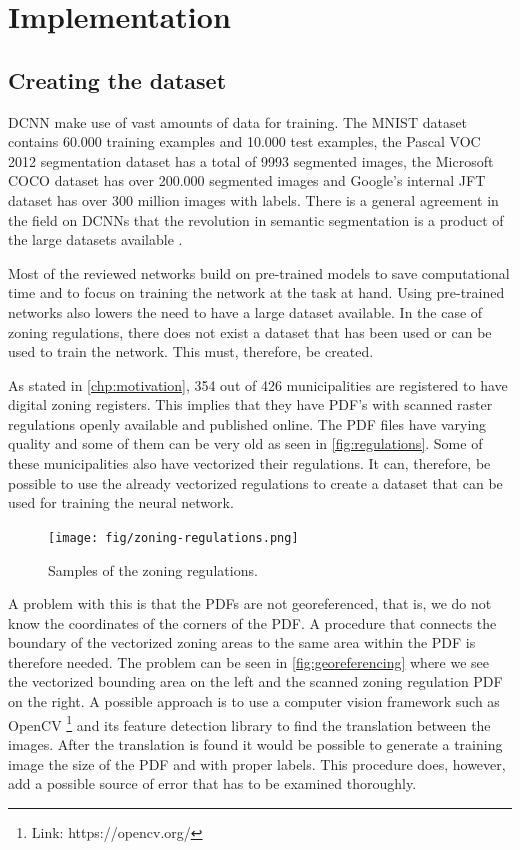 \chapter{Implementation}

\section{Creating the dataset}\label{chp:dataset}
DCNN make use of vast amounts of data for training. The MNIST dataset contains 60.000 training examples and 10.000 test examples, the Pascal VOC 2012 segmentation dataset \cite{PASCALVOC2012} has a total of 9993 segmented images, the Microsoft COCO dataset \cite{Lin2014} has over 200.000 segmented images and Google's internal JFT dataset \cite{Hinton2015} has over 300 million images with labels. There is a general agreement in the field on DCNNs that the revolution in semantic segmentation is a product of the large datasets available \cite{Sun2017}.

Most of the reviewed networks build on pre-trained models to save computational time and to focus on training the network at the task at hand. Using pre-trained networks also lowers the need to have a large dataset available. In the case of zoning regulations, there does not exist a dataset that has been used or can be used to train the network. This must, therefore, be created.

As stated in \autoref{chp:motivation}, 354 out of 426 municipalities are registered to have digital zoning registers. This implies that they have PDF's with scanned raster regulations openly available and published online. The PDF files have varying quality and some of them can be very old as seen in \autoref{fig:regulations}. Some of these municipalities also have vectorized their regulations. It can, therefore, be possible to use the already vectorized regulations to create a dataset that can be used for training the neural network.

\begin{figure}[H]
    \centering
    \texttt{[image: fig/zoning-regulations.png]}
    \caption{Samples of the zoning regulations.}
    \label{fig:regulations}
\end{figure}

A problem with this is that the PDFs are not georeferenced, that is, we do not know the coordinates of the corners of the PDF. A procedure that connects the boundary of the vectorized zoning areas to the same area within the PDF is therefore needed. The problem can be seen in \autoref{fig:georeferencing} where we see the vectorized bounding area on the left and the scanned zoning regulation PDF on the right. A possible approach is to use a computer vision framework such as OpenCV \footnote{Link: https://opencv.org/} and its feature detection library to find the translation between the images. After the translation is found it would be possible to generate a training image the size of the PDF and with proper labels. This procedure does, however, add a possible source of error that has to be examined thoroughly.

